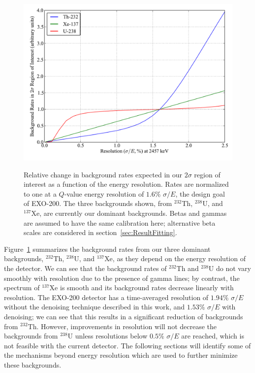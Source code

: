 \begin{figure}
\begin{center}
\includegraphics[keepaspectratio=true,width=\textwidth]{scripts/BackgroundsVsRes.pdf}
\end{center}
\renewcommand{\baselinestretch}{1}
\small\normalsize
\begin{quote}
\caption{Relative change in background rates expected in our $2\sigma$ region of interest as a function of the energy resolution.  Rates are normalized to one at a $Q$-value energy resolution of $1.6\%$ $\sigma/E$, the design goal of EXO-200.  The three backgrounds shown, from $^{232}$Th, $^{238}$U, and $^{137}$Xe, are currently our dominant backgrounds.  Betas and gammas are assumed to have the same calibration here; alternative beta scales are considered in section~\ref{sec:ResultFitting}.}
\label{fig:BackgroundVsResolution}
\end{quote}
\end{figure}
\renewcommand{\baselinestretch}{2}
\small\normalsize

Figure~\ref{fig:BackgroundVsResolution} summarizes the background rates from our three dominant backgrounds, $^{232}$Th, $^{238}$U, and $^{137}$Xe, as they depend on the energy resolution of the detector.  We can see that the background rates of $^{232}$Th and $^{238}$U do not vary smoothly with resolution due to the presence of gamma lines; by contrast, the spectrum of $^{137}$Xe is smooth and its background rates decrease linearly with resolution.  The EXO-200 detector has a time-averaged resolution of $1.94\%$ $\sigma/E$ without the denoising technique described in this work, and $1.53\%$ $\sigma/E$ with denoising; we can see that this results in a significant reduction of backgrounds from $^{232}$Th.  However, improvements in resolution will not decrease the backgrounds from $^{238}$U unless resolutions below $0.5\%$ $\sigma/E$ are reached, which is not feasible with the current detector.  The following sections will identify some of the mechanisms beyond energy resolution which are used to further minimize these backgrounds.

